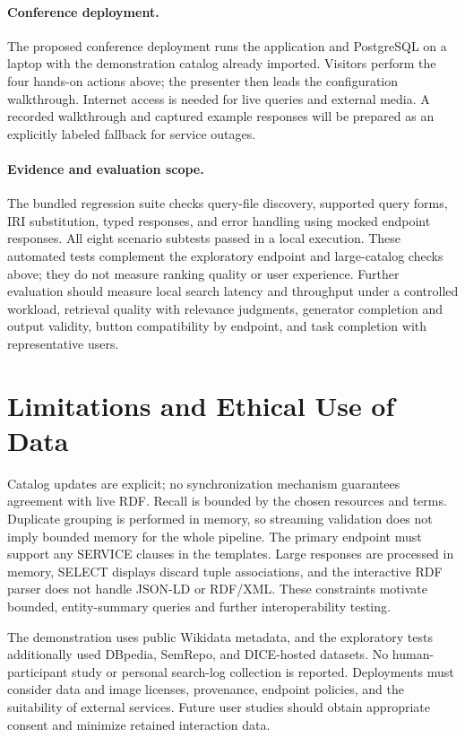 \paragraph{Conference deployment.}
The proposed conference deployment runs the application and PostgreSQL on a laptop with the demonstration catalog already imported. Visitors perform the four hands-on actions above; the presenter then leads the configuration walkthrough. Internet access is needed for live queries and external media. A recorded walkthrough and captured example responses will be prepared as an explicitly labeled fallback for service outages.

\paragraph{Evidence and evaluation scope.}
The bundled regression suite checks query-file discovery, supported query forms, IRI substitution, typed responses, and error handling using mocked endpoint responses. All eight scenario subtests passed in a local execution. These automated tests complement the exploratory endpoint and large-catalog checks above; they do not measure ranking quality or user experience. Further evaluation should measure local search latency and throughput under a controlled workload, retrieval quality with relevance judgments, generator completion and output validity, button compatibility by endpoint, and task completion with representative users.

\section{Limitations and Ethical Use of Data}
Catalog updates are explicit; no synchronization mechanism guarantees agreement with live RDF. Recall is bounded by the chosen resources and terms. Duplicate grouping is performed in memory, so streaming validation does not imply bounded memory for the whole pipeline. The primary endpoint must support any SERVICE clauses in the templates. Large responses are processed in memory, SELECT displays discard tuple associations, and the interactive RDF parser does not handle JSON-LD or RDF/XML. These constraints motivate bounded, entity-summary queries and further interoperability testing.

The demonstration uses public Wikidata metadata, and the exploratory tests additionally used DBpedia, SemRepo, and DICE-hosted datasets. No human-participant study or personal search-log collection is reported. Deployments must consider data and image licenses, provenance, endpoint policies, and the suitability of external services. Future user studies should obtain appropriate consent and minimize retained interaction data.

